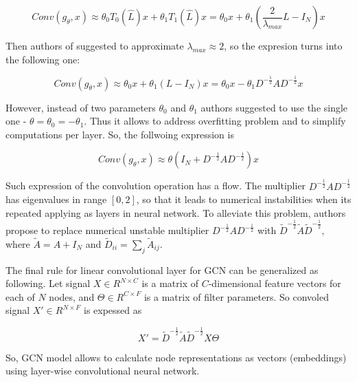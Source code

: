 \begin{equation}
    Conv(g_\theta,x) \approx {\theta}_0 T_0(\hat{L})x + {\theta}_1 T_1(\hat{L})x = {\theta}_0 x + {\theta}_1 (\frac{2}{\lambda_{max}}L-I_N)x
    \label{eq:gcn_conv_appr}
 \end{equation}

Then authors of \cite{GCN} suggested to approximate $\lambda_{max} \approx 2$, so the expresion turns into the following one:

\begin{equation}
    Conv(g_\theta,x) \approx {\theta}_0 x + {\theta}_1 (L-I_N)x = {\theta}_0 x - {\theta}_1 D^{-\frac{1}{2}}AD^{-\frac{1}{2}}x
    \label{eq:gcn_conv_appr2}
 \end{equation}


However, instead of two parameters $\theta_0$ and $\theta_1$ authors suggested to use the single one - $\theta = \theta_0 = -\theta_1$. Thus it allows to
address overfitting problem and to simplify computations per layer. So, the follwoing expression is


\begin{equation}
    Conv(g_\theta,x) \approx {\theta}(I_N + D^{-\frac{1}{2}}AD^{-\frac{1}{2}})x
    \label{eq:gcn_conv_appr3}
 \end{equation}

Such expression of the convolution operation has a flow. The multiplier  $D^{-\frac{1}{2}}AD^{-\frac{1}{2}}$ has eigenvalues in 
range $[0,2]$, so that it leads to numerical instabilities when its repeated applying as layers in neural network. To alleviate this
problem, authors propose to replace numerical unstable multiplier $D^{-\frac{1}{2}}AD^{-\frac{1}{2}}$
with $\tilde{D}^{-\frac{1}{2}}\tilde{A}\tilde{D}^{-\frac{1}{2}}$, where $\tilde{A}=A+I_N$ and $\tilde{D}_{ii}=\sum_{j}\tilde{A}_{ij}$.

The final rule for linear convolutional layer for GCN can be generalized as following. Let signal $X \in R^{N\times C}$ is a matrix of $C$-dimensional
feature vectors for each of $N$ nodes, and $\Theta \in R^{C \times F}$ is a matrix of filter parameters. So convoled signal $X' \in R^{N \times F}$ is 
expessed as 

\begin{equation}
    X' = \tilde{D}^{-\frac{1}{2}}\tilde{A}\tilde{D}^{-\frac{1}{2}}X\Theta
    \label{eq:final_gcn}
\end{equation}

So, GCN model allows to calculate node representations as vectors (embeddings) using layer-wise convolutional neural network.

